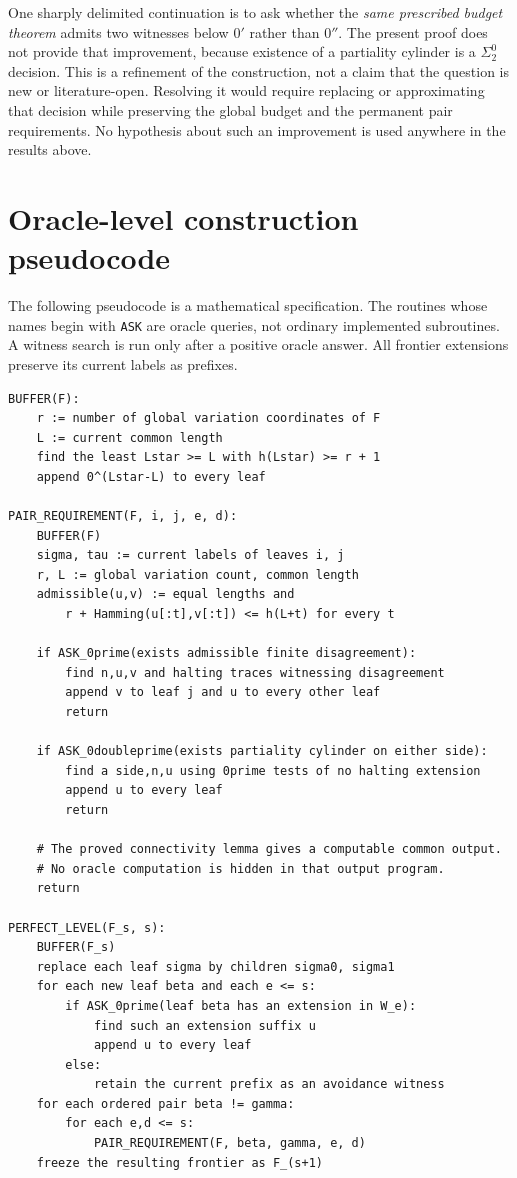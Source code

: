 \documentclass[11pt,a4paper]{article}
\newcommand{\code}[1]{\texttt{#1}}
\theoremstyle{definition}\newtheorem{definition}[theorem]{Definition}
\theoremstyle{remark}\newtheorem{remark}[theorem]{Remark}
\begin{document}
One sharply delimited continuation is to ask whether the \emph{same prescribed
budget theorem} admits two witnesses below $0'$ rather than $0''$.
The present proof does not provide that improvement, because existence of a
partiality cylinder is a $\Sigma^0_2$ decision. This is a refinement of the
construction, not a claim that the question is new or literature-open.
Resolving it would require replacing or approximating that decision while
preserving the global budget and the permanent pair requirements. No
hypothesis about such an improvement is used anywhere in the results above.

\appendix
\section{Oracle-level construction pseudocode}
\label{app:pseudocode}

The following pseudocode is a mathematical specification. The routines whose
names begin with \code{ASK} are oracle queries, not ordinary implemented
subroutines. A witness search is run only after a positive oracle answer.
All frontier extensions preserve its current labels as prefixes.

\begin{lstlisting}
BUFFER(F):
    r := number of global variation coordinates of F
    L := current common length
    find the least Lstar >= L with h(Lstar) >= r + 1
    append 0^(Lstar-L) to every leaf

PAIR_REQUIREMENT(F, i, j, e, d):
    BUFFER(F)
    sigma, tau := current labels of leaves i, j
    r, L := global variation count, common length
    admissible(u,v) := equal lengths and
        r + Hamming(u[:t],v[:t]) <= h(L+t) for every t

    if ASK_0prime(exists admissible finite disagreement):
        find n,u,v and halting traces witnessing disagreement
        append v to leaf j and u to every other leaf
        return

    if ASK_0doubleprime(exists partiality cylinder on either side):
        find a side,n,u using 0prime tests of no halting extension
        append u to every leaf
        return

    # The proved connectivity lemma gives a computable common output.
    # No oracle computation is hidden in that output program.
    return

PERFECT_LEVEL(F_s, s):
    BUFFER(F_s)
    replace each leaf sigma by children sigma0, sigma1
    for each new leaf beta and each e <= s:
        if ASK_0prime(leaf beta has an extension in W_e):
            find such an extension suffix u
            append u to every leaf
        else:
            retain the current prefix as an avoidance witness
    for each ordered pair beta != gamma:
        for each e,d <= s:
            PAIR_REQUIREMENT(F, beta, gamma, e, d)
    freeze the resulting frontier as F_(s+1)
\end{lstlisting}
\end{document}
